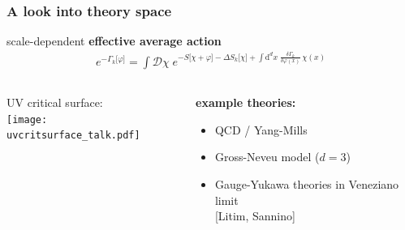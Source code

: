 \documentclass[]{beamer}  %
\begin{document}
\addtocounter{framenumber}{-1}
\begin{frame}
  \frametitle{A look into theory space}
  \vspace{7.5pt}
  scale-dependent \textbf{effective average action}
  \begin{align*}
    \boxed{
    e^{ - \Gamma_k \lbrack \varphi \rbrack }
    = \int \mathcal D \chi \;
    e^{
      - S \lbrack \chi + \varphi \rbrack
      - \Delta S_k \lbrack \chi \rbrack
      + \int \mathrm d^dx \;
      \frac{ \delta \Gamma_k }{ \delta \varphi (x) }
      \, \chi(x)
    }
    }
  \end{align*}
  \vspace{2pt}

  \begin{columns}[T]
    \begin{column}{.6\textwidth}
      UV critical surface:\\[10pt]
      \texttt{[image: uvcritsurface\_talk.pdf]}
    \end{column}
    \begin{column}{.4\textwidth}
      \begin{center}
        \textbf{example theories:}\\[10pt]
        \begin{itemize}
          \item QCD / Yang-Mills
          \item Gross-Neveu model ($d=3$)
          \item Gauge-Yukawa theories in Veneziano limit\\[3pt]
            \hfill [Litim, Sannino]
        \end{itemize}
      \end{center}
    \end{column}
  \end{columns}
\end{frame}


\end{document}

